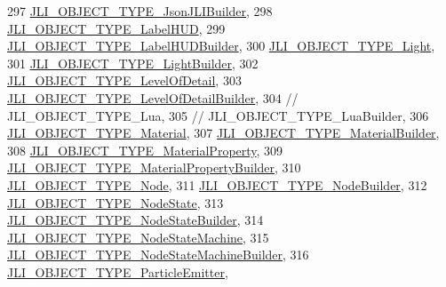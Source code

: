 \begin{DoxyCode}
297     \mbox{\hyperlink{namespacenjli_a6d56d4fbaf89fcf3e3d32839df05b444acc4baa24fbb55b5e43aa181b847ba262}{JLI\_OBJECT\_TYPE\_JsonJLIBuilder}},
298     \mbox{\hyperlink{namespacenjli_a6d56d4fbaf89fcf3e3d32839df05b444a9a4c53a9a498a581983b05d487d9fa3f}{JLI\_OBJECT\_TYPE\_LabelHUD}},
299     \mbox{\hyperlink{namespacenjli_a6d56d4fbaf89fcf3e3d32839df05b444a1b744496170b08bd5e21cf8ad09fa9ae}{JLI\_OBJECT\_TYPE\_LabelHUDBuilder}},
300     \mbox{\hyperlink{namespacenjli_a6d56d4fbaf89fcf3e3d32839df05b444ad7db3595f7272df0b4f9d01f2eec308b}{JLI\_OBJECT\_TYPE\_Light}},
301     \mbox{\hyperlink{namespacenjli_a6d56d4fbaf89fcf3e3d32839df05b444a6f47081705420a4e91ee86ffd5748f0c}{JLI\_OBJECT\_TYPE\_LightBuilder}},
302     \mbox{\hyperlink{namespacenjli_a6d56d4fbaf89fcf3e3d32839df05b444aeb75dbe890906fbc20ba22a490daf8ee}{JLI\_OBJECT\_TYPE\_LevelOfDetail}},
303     \mbox{\hyperlink{namespacenjli_a6d56d4fbaf89fcf3e3d32839df05b444a082cb0381e2ba760f1bc22ccc09689af}{JLI\_OBJECT\_TYPE\_LevelOfDetailBuilder}},
304     \textcolor{comment}{//        JLI\_OBJECT\_TYPE\_Lua,}
305     \textcolor{comment}{//        JLI\_OBJECT\_TYPE\_LuaBuilder,}
306     \mbox{\hyperlink{namespacenjli_a6d56d4fbaf89fcf3e3d32839df05b444a6ac84b76c50d1269976e3a7ef341e8f0}{JLI\_OBJECT\_TYPE\_Material}},
307     \mbox{\hyperlink{namespacenjli_a6d56d4fbaf89fcf3e3d32839df05b444a7f7180f9dddec568a8f8ef8595058909}{JLI\_OBJECT\_TYPE\_MaterialBuilder}},
308     \mbox{\hyperlink{namespacenjli_a6d56d4fbaf89fcf3e3d32839df05b444a2d9e3b74b508d63b45116354d4777d00}{JLI\_OBJECT\_TYPE\_MaterialProperty}},
309     \mbox{\hyperlink{namespacenjli_a6d56d4fbaf89fcf3e3d32839df05b444ab6c9abc4ed5a32ac46c04ada21f10139}{JLI\_OBJECT\_TYPE\_MaterialPropertyBuilder}},
310     \mbox{\hyperlink{namespacenjli_a6d56d4fbaf89fcf3e3d32839df05b444a078b58bdb2d20fe4a3fe7203a2aa25a0}{JLI\_OBJECT\_TYPE\_Node}},
311     \mbox{\hyperlink{namespacenjli_a6d56d4fbaf89fcf3e3d32839df05b444a143ed7af74b73ee3a4aff4ce7d166276}{JLI\_OBJECT\_TYPE\_NodeBuilder}},
312     \mbox{\hyperlink{namespacenjli_a6d56d4fbaf89fcf3e3d32839df05b444ad1e8b653ae3a0a8d8feb2a705bcdcd95}{JLI\_OBJECT\_TYPE\_NodeState}},
313     \mbox{\hyperlink{namespacenjli_a6d56d4fbaf89fcf3e3d32839df05b444ab4a7ce463eaf980a613fe2df777ff6da}{JLI\_OBJECT\_TYPE\_NodeStateBuilder}},
314     \mbox{\hyperlink{namespacenjli_a6d56d4fbaf89fcf3e3d32839df05b444a29c7365c2c16e80d2ed7ee4f6668e15f}{JLI\_OBJECT\_TYPE\_NodeStateMachine}},
315     \mbox{\hyperlink{namespacenjli_a6d56d4fbaf89fcf3e3d32839df05b444aee798bb81ac3b1aa118b4bc89cca4e21}{JLI\_OBJECT\_TYPE\_NodeStateMachineBuilder}},
316     \mbox{\hyperlink{namespacenjli_a6d56d4fbaf89fcf3e3d32839df05b444a0aab6d0a92dc47d92d453bd0d48528d4}{JLI\_OBJECT\_TYPE\_ParticleEmitter}},

\end{DoxyCode}
